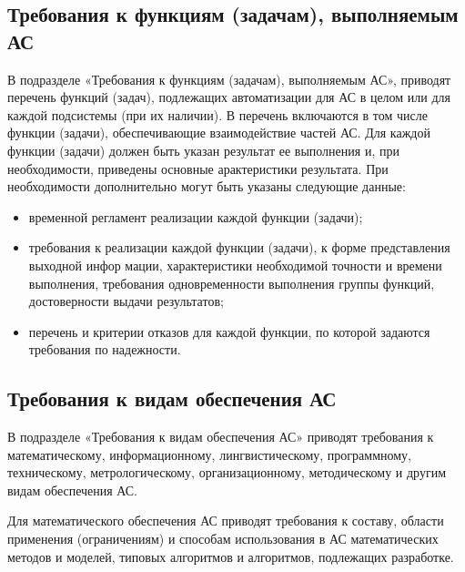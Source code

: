 {\subsection{Требования к функциям (задачам), выполняемым АС}
В подразделе «Требования к функциям (задачам), выполняемым АС», приводят перечень функций (задач), подлежащих автоматизации для АС в целом или для каждой подсистемы (при их наличии). В перечень включаются в том числе функции  (задачи), обеспечивающие взаимодействие частей АС.
Для каждой функции (задачи) должен быть указан результат ее выполнения и, при необходимости, приведены основные арактеристики результата. При необходимости дополнительно могут быть указаны следующие данные:
\begin{itemize}
  \item временной регламент реализации каждой функции (задачи);
  \item требования к реализации каждой функции (задачи), к форме представления выходной инфор мации, характеристики необходимой точности и времени выполнения, требования одновременности выполнения группы функций, достоверности выдачи результатов;
  \item перечень и критерии отказов для каждой функции, по которой задаются требования по надежности.
\end{itemize}
\subsection{Требования к видам обеспечения АС}
В подразделе «Требования к видам обеспечения АС» приводят требования к математическому, информационному, лингвистическому, программному, техническому, метрологическому, организационному, методическому и другим видам обеспечения АС.

Для математического обеспечения АС приводят требования к составу, области применения (ограничениям) и способам использования в АС математических методов и моделей, типовых алгоритмов и алгоритмов, подлежащих разработке.

}
